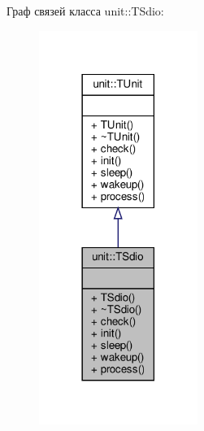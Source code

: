 Граф связей класса unit\+:\+:T\+Sdio\+:\nopagebreak
\begin{figure}[H]
\begin{center}
\leavevmode
\includegraphics[width=146pt]{classunit_1_1_t_sdio__coll__graph}
\end{center}
\end{figure}
